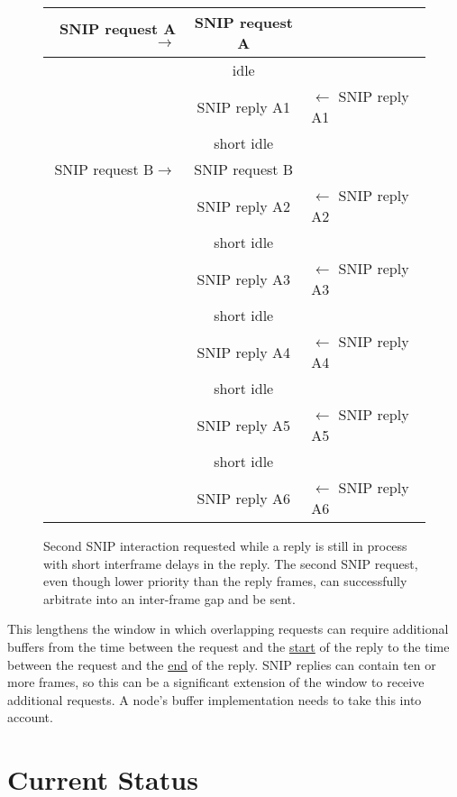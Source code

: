 \documentclass[11pt]{article}
\begin{document}
\begin{figure}[!hbp]
\begin{center}
\begin{tabular}{ r | c | l}
\hline
SNIP request A$\rightarrow$ & SNIP request A& \\ \hline

    & idle & \\ \hline

    & SNIP reply A1  & $\leftarrow$ SNIP reply A1 \\ \hline
    
    & short idle & \\ \hline
SNIP request B$\rightarrow$ & SNIP request B & \\ \hline

    & SNIP reply A2  & $\leftarrow$ SNIP reply A2 \\ \hline
    & short idle & \\ \hline
    & SNIP reply A3  & $\leftarrow$ SNIP reply A3 \\ \hline
    & short idle & \\ \hline
    & SNIP reply A4  & $\leftarrow$ SNIP reply A4 \\ \hline
    & short idle & \\ \hline
    & SNIP reply A5  & $\leftarrow$ SNIP reply A5 \\ \hline
    & short idle & \\ \hline
    & SNIP reply A6  & $\leftarrow$ SNIP reply A6 \\ \hline
\end{tabular}
\end{center}
\caption{Second SNIP interaction requested while a reply is still in process
with short interframe delays in the reply.
The second SNIP request, even though lower priority than the reply frames,
can successfully arbitrate into an inter-frame gap and be sent.}
\label{fig:normal_double_SNIP_interaction_with_delay}
\end{figure}

This lengthens the window in which overlapping
requests can require additional buffers from the time between
the request and the \underline{start} of the reply
to the time between the request and the \underline{end} of the reply.
SNIP replies can contain ten or more frames, so this 
can be a significant extension of the window to receive additional requests.
A node's buffer implementation needs to take this into account.

\clearpage
\cbstart
\section{Current Status}
\end{document}
